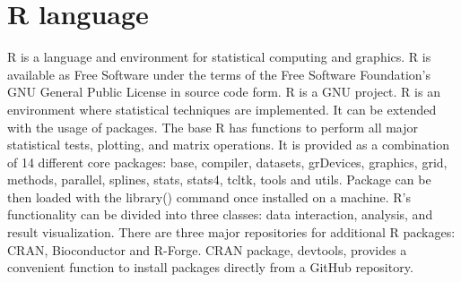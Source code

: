 \section{R language}\label{Rlanguage}
R is a language and environment for statistical computing and graphics. R is available as Free Software under the terms of the Free Software Foundation's GNU General Public License in source code form. R is a GNU project. R is an environment where statistical techniques are implemented. It can be extended with the usage of packages. \cite{RWebPage} The base R has functions to perform all major statistical tests, plotting, and matrix operations. It is provided as a combination of 14 different core packages: base, compiler, datasets, grDevices, graphics, grid, methods, parallel, splines, stats, stats4, tcltk, tools and utils. Package can be then loaded with the library() command once installed on a machine. R's functionality can be divided into three classes: data interaction, analysis, and result visualization. There are three major repositories for additional R packages: CRAN, Bioconductor and R-Forge. CRAN package, devtools, provides a convenient function to install packages directly from a GitHub repository. \cite{Giorgi2022TheRL}
